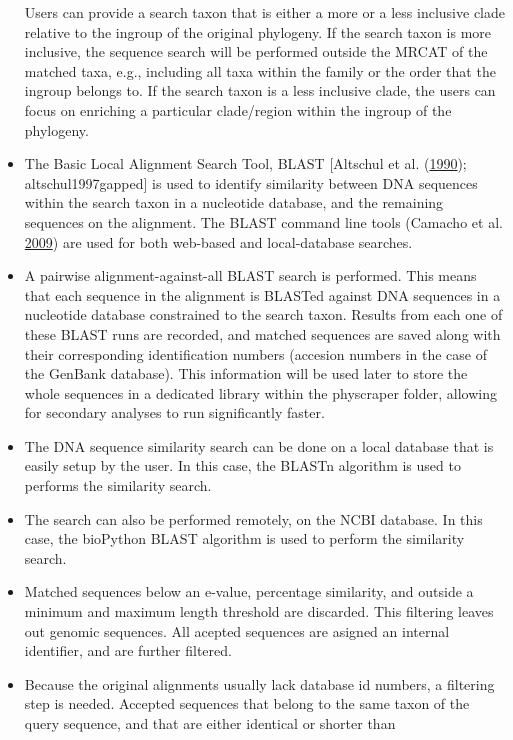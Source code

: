 \documentclass[]{article}
\begin{document}
\begin{itemize}
  Users can provide a search taxon that is either a more or a less inclusive
  clade relative to the ingroup of the original phylogeny. If the search taxon is more inclusive, the sequence search will be performed outside the MRCAT of the matched taxa, e.g., including all taxa within
  the family or the order that the ingroup belongs to. If the search taxon is a less inclusive clade, the users can focus on enriching a particular clade/region within the ingroup of the phylogeny.
\item
  The Basic Local Alignment Search Tool, BLAST {[}Altschul et al. (\protect\hyperlink{ref-altschul1990basic}{1990}); altschul1997gapped{]} is used to identify
  similarity between DNA sequences within the search taxon in a nucleotide
  database, and the remaining sequences on the alignment.
  The BLAST command line tools (Camacho et al. \protect\hyperlink{ref-camacho2009blast}{2009}) are used for both web-based and local-database searches.
\item
  A pairwise alignment-against-all BLAST search is performed. This means that each sequence
  in the alignment is BLASTed against DNA sequences in a nucleotide database constrained to the search
  taxon. Results from each one of these BLAST runs are recorded, and matched sequences are saved
  along with their corresponding identification numbers (accesion numbers in the case of the GenBank database). This information will be used later to store the whole sequences in a dedicated library within the physcraper folder, allowing for secondary analyses to run significantly faster.
\item
  The DNA sequence similarity search can be done on a local database that is easily
  setup by the user. In this case, the BLASTn algorithm is used to performs the similarity search.
\item
  The search can also be performed remotely, on the NCBI database. In this case, the
  bioPython BLAST algorithm is used to perform the similarity search.
\item
  Matched sequences below an e-value, percentage similarity, and outside a minimum
  and maximum length threshold are discarded. This filtering leaves out genomic sequences.
  All acepted sequences are asigned an internal identifier, and are further filtered.
\item
  Because the original alignments usually lack database id numbers, a filtering
  step is needed. Accepted sequences that belong to the
  same taxon of the query sequence, and that are either identical or shorter than

\end{itemize}
\end{document}
